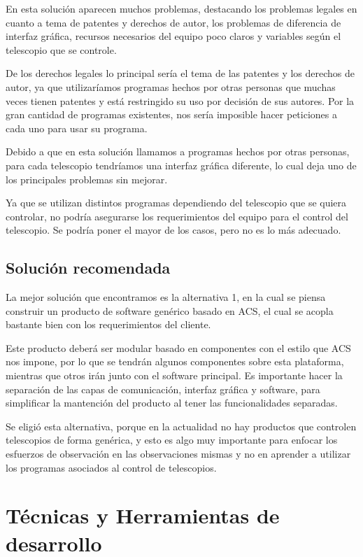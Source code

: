 \documentclass[letterpaper,titlepage,spanish,10pt]{article}
\begin{document}
En esta soluci\'on aparecen muchos problemas, destacando los problemas legales en 
cuanto a tema de patentes y derechos de autor, los problemas de diferencia de 
interfaz gr\'afica, recursos necesarios del equipo poco claros y variables seg\'un 
el telescopio que se controle.

De los derechos legales lo principal ser\'ia el tema de las patentes y los derechos
de autor, ya que utilizar\'iamos programas hechos por otras personas que muchas 
veces tienen patentes y est\'a restringido su uso por decisi\'on de sus autores. 
Por la gran cantidad de programas existentes, nos ser\'ia imposible hacer peticiones 
a cada uno para usar su programa.

Debido a que en esta soluci\'on llamamos a programas hechos por otras personas, para
cada telescopio tendr\'iamos una interfaz gr\'afica diferente, lo cual deja uno de 
los principales problemas sin mejorar.

Ya que se utilizan distintos programas dependiendo del telescopio que se quiera 
controlar, no podr\'ia asegurarse los requerimientos del equipo para el control del
telescopio. Se podr\'ia poner el mayor de los casos, pero no es lo m\'as adecuado.

\subsection{Soluci\'on recomendada} %
La mejor soluci\'on que encontramos es la alternativa 1, en la cual se piensa construir
un producto de software gen\'erico basado en ACS, el cual se acopla bastante bien 
con los requerimientos del cliente.

Este producto deber\'a ser modular basado en componentes con el estilo que ACS nos
impone, por lo que se tendr\'an algunos componentes sobre esta plataforma, mientras que
otros ir\'an junto con el software principal. Es importante hacer la separaci\'on
de las capas de comunicaci\'on, interfaz gr\'afica y software, para simplificar la
mantenci\'on del producto al tener las funcionalidades separadas.

Se eligi\'o esta alternativa, porque en la actualidad no hay productos que controlen
telescopios de forma gen\'erica, y esto es algo muy importante para enfocar los esfuerzos
de observaci\'on en las observaciones mismas y no en aprender a utilizar los programas
asociados al control de telescopios.


\newpage
\section{T\'ecnicas y Herramientas de desarrollo} %
\end{document}
